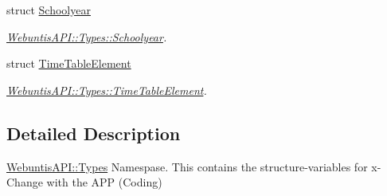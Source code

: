 \begin{DoxyCompactItemize}
struct \hyperlink{struct_webuntis_a_p_i_1_1_types_1_1_schoolyear}{Schoolyear}
\begin{DoxyCompactList}\small\item\em \hyperlink{struct_webuntis_a_p_i_1_1_types_1_1_schoolyear}{Webuntis\-A\-P\-I\-::\-Types\-::\-Schoolyear}. \end{DoxyCompactList}\item 
struct \hyperlink{struct_webuntis_a_p_i_1_1_types_1_1_time_table_element}{Time\-Table\-Element}
\begin{DoxyCompactList}\small\item\em \hyperlink{struct_webuntis_a_p_i_1_1_types_1_1_time_table_element}{Webuntis\-A\-P\-I\-::\-Types\-::\-Time\-Table\-Element}. \end{DoxyCompactList}\end{DoxyCompactItemize}


\subsection{Detailed Description}
\hyperlink{namespace_webuntis_a_p_i_1_1_types}{Webuntis\-A\-P\-I\-::\-Types} Namespase. This contains the structure-\/variables for x-\/\-Change with the A\-P\-P (Coding) 